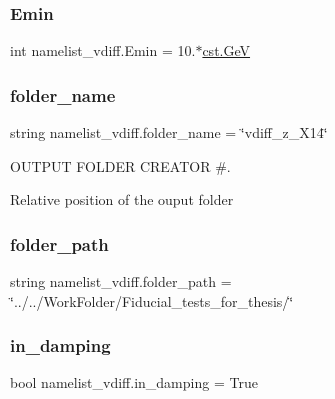 \subsubsection{\texorpdfstring{Emin}{Emin}}
{\footnotesize\ttfamily int namelist\+\_\+vdiff.\+Emin = 10.$\ast$\hyperlink{constants_8h_aec0e126d9991db8ad0b26139f5860568}{cst.\+GeV}}

\mbox{\label{namespacenamelist__vdiff_a39763c29a287e42f404c27bcd47325ce}} 
\subsubsection{\texorpdfstring{folder\+\_\+name}{folder\_name}}
{\footnotesize\ttfamily string namelist\+\_\+vdiff.\+folder\+\_\+name = \char`\"{}vdiff\+\_\+z\+\_\+\+X14\char`\"{}}



O\+U\+T\+P\+UT F\+O\+L\+D\+ER C\+R\+E\+A\+T\+OR \#. 

Relative position of the ouput folder \mbox{\label{namespacenamelist__vdiff_a71b64d0fbe9ace4295b1a38edf62f35f}} 
\subsubsection{\texorpdfstring{folder\+\_\+path}{folder\_path}}
{\footnotesize\ttfamily string namelist\+\_\+vdiff.\+folder\+\_\+path = \char`\"{}../../Work\+Folder/Fiducial\+\_\+tests\+\_\+for\+\_\+thesis/\char`\"{}}

\mbox{\label{namespacenamelist__vdiff_a78c8c22343a58ae6050fe495708c6cf5}} 
\subsubsection{\texorpdfstring{in\+\_\+damping}{in\_damping}}
{\footnotesize\ttfamily bool namelist\+\_\+vdiff.\+in\+\_\+damping = True}



